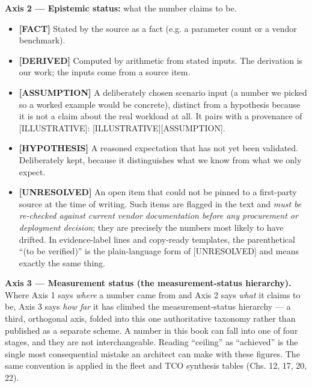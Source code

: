 \medskip
\noindent\textbf{Axis 2 --- Epistemic status:} what the number claims to be.

\begin{itemize}\tightlist
\item \textbf{\textsc{[FACT]}} Stated by the source as a fact (e.g. a parameter count or a vendor benchmark).
\item \textbf{\textsc{[DERIVED]}} Computed by arithmetic from stated inputs. The derivation is our work; the inputs come from a source item.
\item \textbf{\textsc{[ASSUMPTION]}} A deliberately chosen scenario input (a number we picked so a worked example would be concrete), distinct from a hypothesis because it is not a claim about the real workload at all. It pairs with a provenance of \textsc{[ILLUSTRATIVE]}: \textsc{[ILLUSTRATIVE][ASSUMPTION]}.
\item \textbf{\textsc{[HYPOTHESIS]}} A reasoned expectation that has not yet been validated. Deliberately kept, because it distinguishes what we know from what we only expect.
\item \textbf{\textsc{[UNRESOLVED]}} An open item that could not be pinned to a first-party source at the time of writing. Such items are flagged in the text and \emph{must be re-checked against current vendor documentation before any procurement or deployment decision}; they are precisely the numbers most likely to have drifted. In evidence-label lines and copy-ready templates, the parenthetical ``(to be verified)'' is the plain-language form of \textsc{[UNRESOLVED]} and means exactly the same thing.
\end{itemize}

\medskip
\noindent\textbf{Axis 3 --- Measurement status (the measurement-status hierarchy).} Where Axis 1 says \emph{where} a number came from and Axis 2 says \emph{what} it claims to be, Axis 3 says \emph{how far} it has climbed the measurement-status hierarchy --- a third, orthogonal axis, folded into this one authoritative taxonomy rather than published as a separate scheme. A number in this book can fall into one of four stages, and they are not interchangeable. Reading ``ceiling'' as ``achieved'' is the single most consequential mistake an architect can make with these figures. The same convention is applied in the fleet and TCO synthesis tables (Chs. 12, 17, 20, 22).


